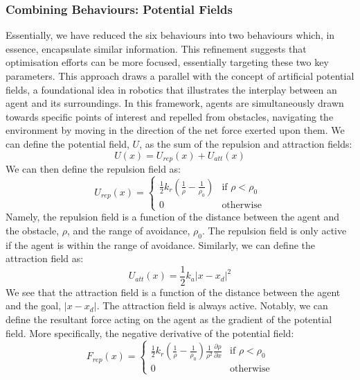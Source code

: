 \documentclass[12pt]{article}
\begin{document}
\subsubsection{Combining Behaviours: Potential Fields}
Essentially, we have reduced the six behaviours into two behaviours which, in essence, encapsulate similar information. This refinement suggests that optimisation efforts can be more focused, essentially targeting these two key parameters. This approach draws a parallel with the concept of artificial potential fields, a foundational idea in robotics that illustrates the interplay between an agent and its surroundings. In this framework, agents are simultaneously drawn towards specific points of interest and repelled from obstacles, navigating the environment by moving in the direction of the net force exerted upon them. We can define the potential field, $U$, as the sum of the repulsion and attraction fields:
\begin{equation}
    U(x) = U_{rep}(x) + U_{att}(x)
\end{equation}
We can then define the repulsion field as:
\begin{equation}
    U_{rep}(x) = 
    \begin{cases}
        \frac{1}{2}k_r(\frac{1}{\rho}-\frac{1}{\rho_0}) & \text{if } \rho < \rho_0 \\
        0 & \text{otherwise}
    \end{cases}
\end{equation}
Namely, the repulsion field is a function of the distance between the agent and the obstacle, $\rho$, and the range of avoidance, $\rho_0$. The repulsion field is only active if the agent is within the range of avoidance. Similarly, we can define the attraction field as:
\begin{equation}
    U_{att}(x) = \frac{1}{2}k_a|x-x_d|^2
\end{equation}
We see that the attraction field is a function of the distance between the agent and the goal, $|x-x_d|$. The attraction field is always active. Notably, we can define the resultant force acting on the agent as the gradient of the potential field. More specifically, the negative derivative of the potential field:
\begin{equation}
    F_{rep}(x) = 
    \begin{cases}
        \frac{1}{2}k_r(\frac{1}{\rho}-\frac{1}{\rho_0})\frac{1}{\rho^2}\frac{\partial \rho}{\partial x} & \text{if } \rho < \rho_0 \\
        0 & \text{otherwise}
    \end{cases}
\end{equation}
\end{document}
